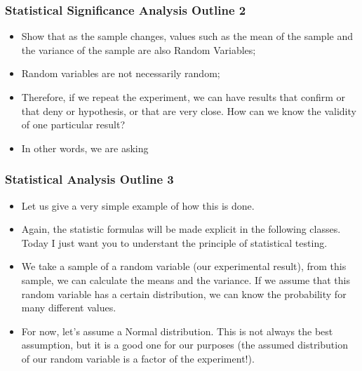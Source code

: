\documentclass{beamer}
\begin{document}
\begin{frame}
  \frametitle{Statistical Significance Analysis Outline 2}
  \begin{itemize}
    \item Show that as the sample changes, values such as the mean of
      the sample and the variance of the sample are also Random
      Variables;
    \item Random variables are not necessarily random;
    \item Therefore, if we repeat the experiment, we can have results
      that confirm or that deny or hypothesis, or that are very
      close. How can we know the validity of one particular result?
    \item In other words, we are asking 
  \end{itemize}
\end{frame}

\begin{frame}
  \frametitle{Statistical Analysis Outline 3}
  \begin{itemize}
  \item Let us give a very simple example of how this is done. 
  \item Again, the statistic formulas will be made explicit in the
    following classes. Today I just want you to understant the
    principle of statistical testing.
  \item We take a sample of a random variable (our experimental
    result), from this sample, we can calculate the means and the
    variance. If we assume that this random variable has a certain
    distribution, we can know the probability for many different
    values.
  \item For now, let's assume a Normal distribution. This is not
    always the best assumption, but it is a good one for our purposes
    (the assumed distribution of our random variable is a factor of
    the experiment!).
  \end{itemize}
\end{frame}
\end{document}
